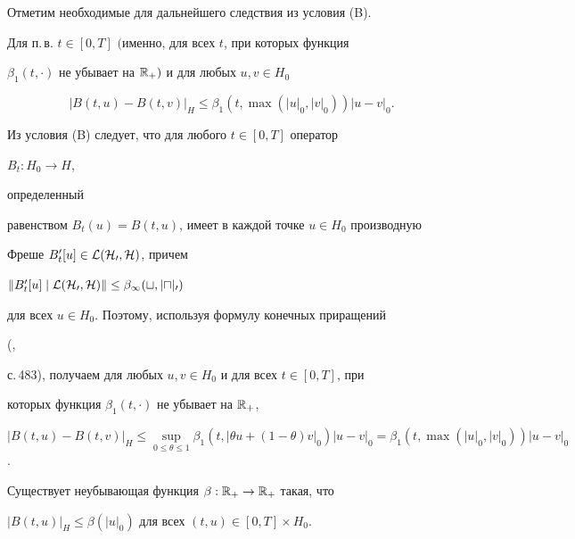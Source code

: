  


Отметим необходимые для дальнейшего следствия из условия (B). 


 


\begin{lem} 


Для п.\,в.{} $t\in[0,T]$ $($именно, для всех $t$, при которых функция 


$\beta_1(t,\cdot)$ не убывает на $\Bbb R_+)$ и для любых $u,v\in H_0$ 


\begin{equation} 


|B(t,u)-B(t,v)|_H\le \beta_1(t,\max(|u|_0,|v|_0))|u-v|_0. 


\end{equation} 


\end{lem} 


 


\begin{pf} 


Из условия (B) следует, что для любого $t\in[0,T]$ оператор 


$B_t:H_0\to H$, 


определенный 


равенством $B_t(u)=B(t,u)$, имеет в каждой точке $u\in H_0$ производную 


Фреше $B'_t[u]\in\cal L(H_0,H)$, причем 


$\|B'_t[u]\mid\cal L(H_0,H)\|\le\beta_1(t,|u|_0)$ 


для всех $u\in H_0$. Поэтому, используя формулу конечных приращений 


(\cite{14}, 


с.\,483), получаем для любых $u,v\in H_0$ и для всех $t\in[0,T]$, при 


которых функция $\beta_1(t,\cdot)$ не убывает на $\Bbb R_+$, 


$|B(t,u)-B(t,v)|_H\le\sup\limits_{0\le\theta\le 1} 


\beta_1(t,|\theta u+(1-\theta)v|_0)|u-v|_0= 


\beta_1(t,\max(|u|_0,|v|_0))|u-v|_0$. 


\end{pf} 


 


\begin{lem} 


Существует неубывающая функция $\beta:\Bbb R_+\to\Bbb R_+$ такая, что 


$|B(t,u)|_H\le\beta(|u|_0)$ для всех $(t,u)\in[0,T]\times H_0$. 


\end{lem} 


